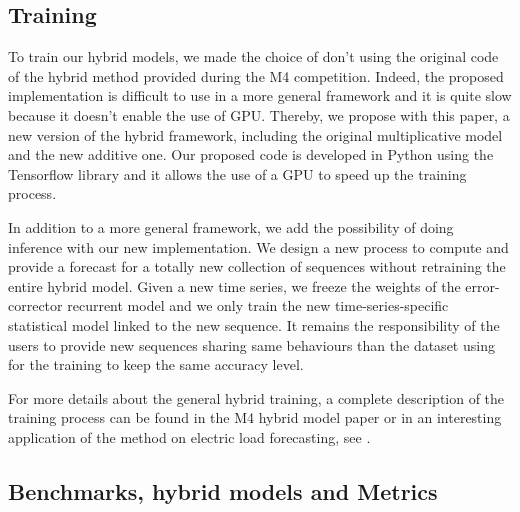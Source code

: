 \documentclass[letterpaper]{article} %
\begin{document}
\subsection{Training}

To train our hybrid models, we made the choice of don't using the original code of the hybrid method provided during the M4 competition. Indeed, the proposed implementation is difficult to use in a more general framework and it is quite slow because it doesn't enable the use of GPU. Thereby, we propose with this paper, a new version of the hybrid framework, including the original multiplicative model and the new additive one. Our proposed code is developed in Python using the Tensorflow library and it allows the use of a GPU to speed up the training process.

In addition to a more general framework, we add the possibility of doing inference with our new implementation. We design a new process to compute and provide a forecast for a totally  new collection of sequences without retraining the entire hybrid model. Given a new time series, we freeze the weights of the error-corrector recurrent model and we only train the new time-series-specific statistical model linked to the new sequence. It remains the responsibility of the users to provide new sequences sharing same behaviours than the dataset using for the training to keep the same accuracy level.

For more details about the general hybrid training, a complete description of the training process can be found in the M4 hybrid model paper or in an interesting application of the method on electric load forecasting, see \citep{dudek2020hybrid}.

\subsection{Benchmarks, hybrid models and Metrics}
\end{document}
